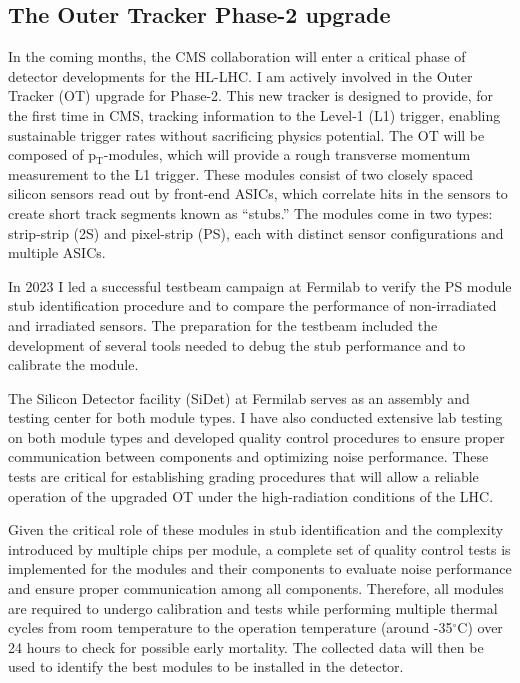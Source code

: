 {\begin{flushleft}
\subsection{The Outer Tracker Phase-2 upgrade}
\vspace{\baselineskip}
In the coming months, the CMS collaboration will enter a critical phase of detector developments for the HL-LHC. I am actively involved in the Outer Tracker (OT) upgrade for Phase-2. This new tracker is designed to provide, for the first time in CMS, tracking information to the Level-1 (L1) trigger, enabling sustainable trigger rates without sacrificing physics potential. The OT will be composed of p$_{\mathrm{T}}$-modules, which will provide a rough transverse momentum measurement to the L1 trigger. These modules consist of two closely spaced silicon sensors read out by front-end ASICs, which correlate hits in the sensors to create short track segments known as ``stubs.'' The modules come in two types: strip-strip (2S) and pixel-strip (PS), each with distinct sensor configurations and multiple ASICs.

In 2023 I led a successful testbeam campaign at Fermilab to verify the PS module stub identification procedure and to compare the performance of non-irradiated and irradiated sensors. The preparation for the testbeam included the development of several tools needed to debug the stub performance and to calibrate the module.

The Silicon Detector facility (SiDet) at Fermilab serves as an assembly and testing center for both module types. I have also conducted extensive lab testing on both module types and developed quality control procedures to ensure proper communication between components and optimizing noise performance. These tests are critical for establishing grading procedures that will allow a reliable operation of the upgraded OT under the high-radiation conditions of the LHC. 

Given the critical role of these modules in stub identification and the complexity introduced by multiple chips per module, a complete set of quality control tests is implemented for the modules and their components to evaluate noise performance and ensure proper communication among all components. Therefore, all modules are required to undergo calibration and tests while performing multiple thermal cycles from room temperature to the operation temperature (around -35$^{\circ}$C) over 24 hours to check for possible early mortality. The collected data will then be used to identify the best modules to be installed in the detector. 


\end{flushleft}}
